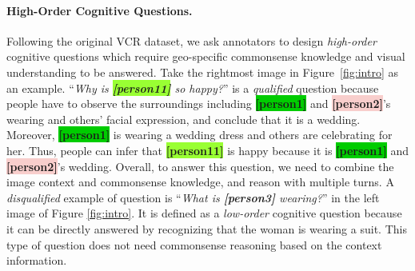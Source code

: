 \documentclass[11pt]{article}
\begin{document}
\paragraph{High-Order Cognitive Questions.}
Following the original VCR dataset, we ask annotators to design \emph{high-order} cognitive questions which require geo-specific commonsense knowledge and visual understanding to be answered. Take the rightmost image in Figure~\ref{fig:intro} as an example. ``\textit{Why is \colorbox[HTML]{99FF33}{\textbf{[person11]}} so happy?}'' is a \emph{qualified} question because people have to observe the surroundings including \colorbox[HTML]{00CC00}{\textbf{[person1]}} and \colorbox[HTML]{F8CECC}{\textbf{[person2]}}'s wearing and others' facial expression, and conclude that it is a wedding. Moreover, \colorbox[HTML]{00CC00}{\textbf{[person1]}} is wearing a wedding dress and others are celebrating for her. Thus, people can infer that \colorbox[HTML]{99FF33}{\textbf{[person11]}} is happy because it is \colorbox[HTML]{00CC00}{\textbf{[person1]}} and \colorbox[HTML]{F8CECC}{\textbf{[person2]}}'s wedding. Overall, to answer this question, we need to combine the image context and commonsense knowledge, and reason with multiple turns. A \emph{disqualified} example of question is ``\textit{What is \colorbox[rgb]{ .891,  .891,  .891}{\textbf{[person3]}} wearing?}'' in the left image of Figure \ref{fig:intro}. It is defined as a \emph{low-order} cognitive question because it can be directly answered by recognizing that the woman is wearing a suit. This type of question does not need commonsense reasoning based on the context information.
\end{document}
